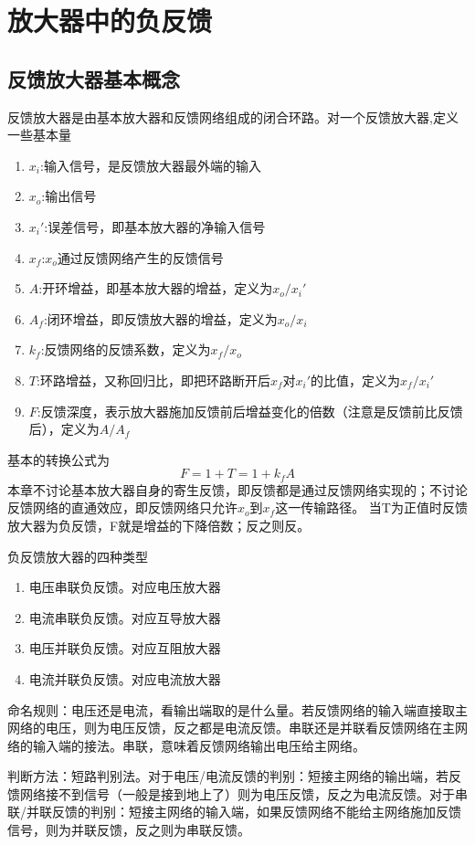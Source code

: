 \documentclass{ctexart}
\begin{document}
\section{放大器中的负反馈}
\subsection{反馈放大器基本概念}
反馈放大器是由基本放大器和反馈网络组成的闭合环路。对一个反馈放大器,定义一些基本量
\begin{enumerate}
    \item $x_i$:输入信号，是反馈放大器最外端的输入
    \item $x_o$:输出信号
    \item $x_i'$:误差信号，即基本放大器的净输入信号
    \item $x_f$:$x_o$通过反馈网络产生的反馈信号
    \item $A$:开环增益，即基本放大器的增益，定义为$x_o/x_i'$
    \item $A_f$:闭环增益，即反馈放大器的增益，定义为$x_o/x_i$
    \item $k_f$:反馈网络的反馈系数，定义为$x_f/x_o$
    \item $T$:环路增益，又称回归比，即把环路断开后$x_f$对$x_i'$的比值，定义为$x_f/x_i'$
    \item $F$:反馈深度，表示放大器施加反馈前后增益变化的倍数（注意是反馈前比反馈后），定义为$A/A_f$
\end{enumerate}
基本的转换公式为
\begin{equation}
    F=1+T=1+k_f A
\end{equation}
本章不讨论基本放大器自身的寄生反馈，即反馈都是通过反馈网络实现的；不讨论反馈网络的直通效应，即反馈网络只允许$x_o$到$x_f$这一传输路径。
当T为正值时反馈放大器为负反馈，F就是增益的下降倍数；反之则反。

负反馈放大器的四种类型
\begin{enumerate}
    \item 电压串联负反馈。对应电压放大器
    \item 电流串联负反馈。对应互导放大器
    \item 电压并联负反馈。对应互阻放大器
    \item 电流并联负反馈。对应电流放大器
\end{enumerate}
命名规则：电压还是电流，看输出端取的是什么量。若反馈网络的输入端直接取主网络的电压，则为电压反馈，反之都是电流反馈。串联还是并联看反馈网络在主网络的输入端的接法。串联，意味着反馈网络输出电压给主网络。

判断方法：短路判别法。对于电压/电流反馈的判别：短接主网络的输出端，若反馈网络接不到信号（一般是接到地上了）则为电压反馈，反之为电流反馈。对于串联/并联反馈的判别：短接主网络的输入端，如果反馈网络不能给主网络施加反馈信号，则为并联反馈，反之则为串联反馈。
\end{document}
